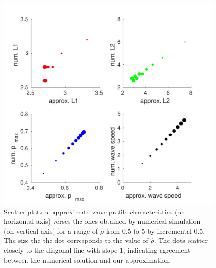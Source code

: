 \documentclass{aims}
\numberwithin{equation}{section}
\begin{document}
\begin{figure}
\begin{center}
\includegraphics[scale=0.7]{plots/scatterplot-new}
\end{center}


\caption{\label{fig:comparison-to-numerical}Scatter plots of approximate wave
profile characteristics (on horizontal axis) verses the ones obtained
by numerical simulation (on vertical axis) for a range of $\hat{\rho}$
from 0.5 to 5 by incremental 0.5. The size the the dot corresponds
to the value of $\hat{\rho}$. The dots scatter closely to the diagonal line with slope 1, indicating agreement between the numerical solution and our approximation.}
\end{figure}
 
\end{document}
